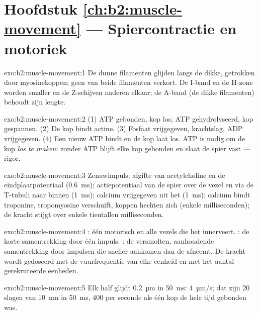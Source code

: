 \section*{Hoofdstuk \ref{ch:b2:muscle-movement} --- Spiercontractie en motoriek}

\begin{solution}{exo:b2:muscle-movement:1}
De dunne filamenten glijden langs de dikke, getrokken door myosinekoppen;
geen van beide filamenten verkort. De I-band en de H-zone worden smaller en
de Z-schijven naderen elkaar; de A-band (de dikke filamenten) behoudt zijn
lengte.
\end{solution}

\begin{solution}{exo:b2:muscle-movement:2}
(1) ATP gebonden, kop los; ATP gehydrolyseerd, kop gespannen. (2) De kop
bindt actine. (3) Fosfaat vrijgegeven, krachtslag, ADP vrijgegeven.
(4) Een nieuw ATP bindt en de kop laat los. ATP is nodig om de kop
\emph{los te maken}: zonder ATP blijft elke kop gebonden en slaat de spier
vast --- rigor.
\end{solution}

\begin{solution}{exo:b2:muscle-movement:3}
Zenuwimpuls; afgifte van acetylcholine en de eindplaatpotentiaal
(\qty{0.6}{ms}); actiepotentiaal van de spier over de vezel en via de
T-tubuli naar binnen (\qty{1}{ms}); calcium vrijgegeven uit het
 (\qty{1}{ms}); calcium bindt troponine,
tropomyosine verschuift, koppen hechten zich (enkele milliseconden); de kracht
stijgt over enkele tientallen milliseconden.
\end{solution}

\begin{solution}{exo:b2:muscle-movement:4}
: één motorisch  en alle vezels die het innerveert.
: de korte samentrekking door één impuls. : de
versmolten, aanhoudende samentrekking door impulsen die sneller aankomen dan
de  afneemt. De kracht wordt gedoseerd met de
vuurfrequentie van elke eenheid en met het aantal gerekruteerde eenheden.
\end{solution}

\begin{solution}{exo:b2:muscle-movement:5}
Elk half  glijdt \qty{0.2}{\micro m} in \qty{50}{ms}:
\qty{4}{\micro m/s}; dat zijn 20 slagen van \qty{10}{nm} in
\qty{50}{ms}, 400 per seconde als één kop de hele tijd gebonden was.
\end{solution}

